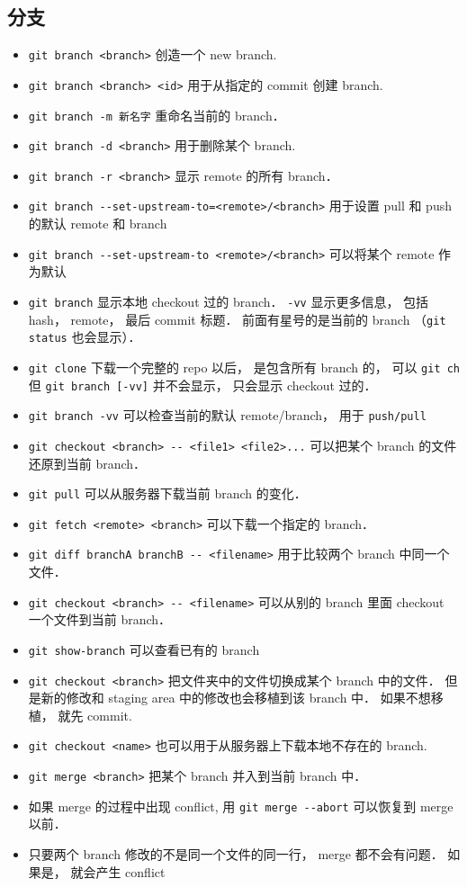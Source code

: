 \subsection{分支}
\begin{itemize}
\item \verb|git branch <branch>| 创造一个 new branch.
\item \verb|git branch <branch> <id>| 用于从指定的 commit 创建 branch.
\item \verb|git branch -m 新名字| 重命名当前的 branch．
\item \verb|git branch -d <branch>| 用于删除某个 branch.
\item \verb|git branch -r <branch>| 显示 remote 的所有 branch．
\item \verb|git branch --set-upstream-to=<remote>/<branch>| 用于设置 pull 和 push 的默认 remote 和 branch
\item \verb|git branch --set-upstream-to <remote>/<branch>| 可以将某个 remote 作为默认
\item \verb|git branch| 显示本地 checkout 过的 branch． \verb|-vv| 显示更多信息， 包括 hash， remote， 最后 commit 标题． 前面有星号的是当前的 branch （\verb|git status| 也会显示）．
\item \verb|git clone| 下载一个完整的 repo 以后， 是包含所有 branch 的， 可以 \verb|git ch| 但 \verb|git branch [-vv]| 并不会显示， 只会显示 checkout 过的．
\item \verb|git branch -vv| 可以检查当前的默认 remote/branch， 用于 \verb|push/pull|

\item \verb|git checkout <branch> -- <file1> <file2>...| 可以把某个 branch 的文件还原到当前 branch．
\item \verb|git pull| 可以从服务器下载当前 branch 的变化．
\item \verb|git fetch <remote> <branch>| 可以下载一个指定的 branch．
\item \verb|git diff branchA branchB -- <filename>| 用于比较两个 branch 中同一个文件．
\item \verb|git checkout <branch> -- <filename>| 可以从别的 branch 里面 checkout 一个文件到当前 branch．

\item \verb|git show-branch| 可以查看已有的 branch 
\item \verb|git checkout <branch>| 把文件夹中的文件切换成某个 branch 中的文件． 但是新的修改和 staging area 中的修改也会移植到该 branch 中． 如果不想移植， 就先 commit.
\item \verb|git checkout <name>| 也可以用于从服务器上下载本地不存在的 branch.
\item \verb|git merge <branch>| 把某个 branch 并入到当前 branch 中．
\item 如果 merge 的过程中出现 conflict, 用 \verb|git merge --abort| 可以恢复到 merge 以前．
\item 只要两个 branch 修改的不是同一个文件的同一行， merge 都不会有问题． 如果是， 就会产生 conflict




\end{itemize}
